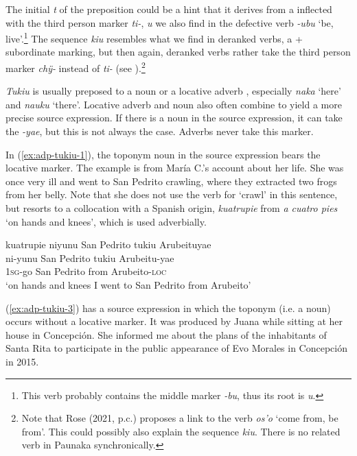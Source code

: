 The initial \textit{t} of the preposition could be a hint that it derives from a  inflected with the third person marker \textit{ti-}, \textit{u} we also find in the defective verb \textit{-ubu} ‘be, live’.\footnote{This verb probably contains the middle marker \textit{-bu}, thus its root is \textit{u}.} The sequence \textit{kiu} resembles what we find in deranked verbs, a  + subordinate marking, but then again, deranked verbs rather take the third person marker \textit{chÿ-} instead of \textit{ti-} (see ).\footnote{Note that Rose (2021, p.c.) proposes a link to the  verb \textit{os’o} ‘come from, be from’. This could possibly also explain the sequence \textit{kiu}. There is no related verb in Paunaka synchronically.}

\textit{Tukiu} is usually preposed to a noun or a locative adverb , especially \textit{naka} ‘here’ and \textit{nauku} ‘there’. Locative adverb and noun also often combine to yield a more precise source expression. If there is a noun in the source expression, it can take the  \textit{-yae}, but this is not always the case. Adverbs never take this marker.

In (\ref{ex:adp-tukiu-1}), the toponym noun in the source expression bears the locative marker. The example is from María C.’s account about her life. She was once very ill and went to San Pedrito crawling, where they extracted two frogs from her belly. Note that she does not use the verb for ‘crawl’ in this sentence, but resorts to a collocation with a Spanish origin, \textit{kuatrupie} from \textit{a cuatro pies} ‘on hands and knees’, which is used adverbially.

\ea\label{ex:adp-tukiu-1}
\begingl
\glpreamble kuatrupie niyunu San Pedrito tukiu Arubeituyae\\
 ni-yunu {San Pedrito} tukiu Arubeitu-yae\\
 1\textsc{sg}-go {San Pedrito} from Arubeito-\textsc{loc}\\
\glft ‘on hands and knees I went to San Pedrito from Arubeito’
\endgl
\trailingcitation{[ump-p110815sf.303]}
\xe

(\ref{ex:adp-tukiu-3}) has a source expression in which the toponym (i.e. a noun) occurs without a locative marker. It was produced by Juana while sitting at her house in Concepción. She informed me about the plans of the inhabitants of Santa Rita to participate in the public appearance of Evo Morales in Concepción in 2015.

